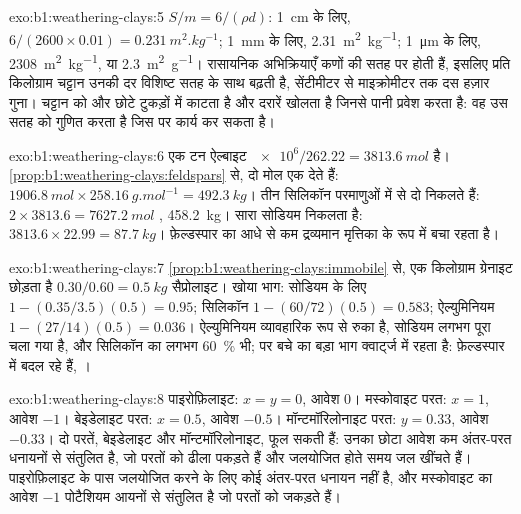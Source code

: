 \begin{solution}{exo:b1:weathering-clays:5}
$S/m = 6/(\rho d)$: \qty{1}{cm} के लिए, $6/(2600\times0.01) =
\qty{0.231}{m^2.kg^{-1}}$; \qty{1}{mm} के लिए, \qty{2.31}{m^2.kg^{-1}}; \qty{1}{\micro m} के लिए,
\qty{2308}{m^2.kg^{-1}}, या \qty{2.3}{m^2.g^{-1}}। रासायनिक अभिक्रियाएँ कणों की सतह पर होती हैं, इसलिए प्रति किलोग्राम चट्टान उनकी दर विशिष्ट सतह के साथ बढ़ती है, सेंटीमीटर से माइक्रोमीटर तक दस हज़ार गुना।  चट्टान को और छोटे टुकड़ों में काटता है और दरारें खोलता है जिनसे पानी प्रवेश करता है: वह उस सतह को गुणित करता है जिस पर  कार्य कर सकता है।
\end{solution}

\begin{solution}{exo:b1:weathering-clays:6}
एक टन ऐल्बाइट $\num{e6}/262.22 = \qty{3813.6}{mol}$ है। \cref{prop:b1:weathering-clays:feldspars} से, दो मोल एक  देते हैं:
$\qty{1906.8}{mol} \times \qty{258.16}{g.mol^{-1}} = \qty{492.3}{kg}$। तीन सिलिकॉन परमाणुओं में से दो निकलते हैं: $2\times3813.6 = \qty{7627.2}{mol}$
, \qty{458.2}{kg}। सारा सोडियम निकलता है: $3813.6\times22.99 =
\qty{87.7}{kg}$। फ़ेल्डस्पार का आधे से कम द्रव्यमान मृत्तिका के रूप में बचा रहता है।
\end{solution}

\begin{solution}{exo:b1:weathering-clays:7}
\cref{prop:b1:weathering-clays:immobile} से, एक किलोग्राम ग्रेनाइट छोड़ता है
$0.30/0.60 = \qty{0.5}{kg}$ सैप्रोलाइट। खोया भाग: सोडियम के लिए $1 -
(0.35/3.5)(0.5) = 0.95$; सिलिकॉन $1 - (60/72)(0.5) = 0.583$; ऐल्युमिनियम $1 -
(27/14)(0.5) = 0.036$। ऐल्युमिनियम व्यावहारिक रूप से रुका है, सोडियम लगभग पूरा चला गया है, और सिलिकॉन का लगभग \qty{60}{\percent} भी; पर बचे का बड़ा भाग क्वार्ट्ज में रहता है: फ़ेल्डस्पार  में बदल रहे हैं, ।
\end{solution}

\begin{solution}{exo:b1:weathering-clays:8}
पाइरोफ़िलाइट: $x = y = 0$, आवेश 0। मस्कोवाइट परत: $x = 1$, आवेश $-1$।
बेइडेलाइट परत: $x = 0.5$, आवेश $-0.5$। मॉन्टमॉरिलोनाइट परत: $y = 0.33$,
आवेश $-0.33$। दो  परतें, बेइडेलाइट और मॉन्टमॉरिलोनाइट, फूल सकती हैं: उनका छोटा आवेश कम अंतर-परत धनायनों से संतुलित है, जो परतों को ढीला पकड़ते हैं और जलयोजित होते समय जल खींचते हैं। पाइरोफ़िलाइट के पास जलयोजित करने के लिए कोई अंतर-परत धनायन नहीं है, और मस्कोवाइट का आवेश $-1$ पोटैशियम आयनों से संतुलित है जो परतों को जकड़ते हैं।
\end{solution}

